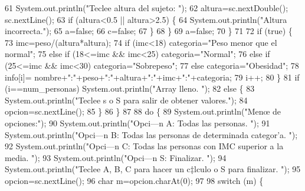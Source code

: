 \begin{DoxyCode}
61                     System.out.println(\textcolor{stringliteral}{"Teclee altura del sujeto: "});
62                     altura=sc.nextDouble(); sc.nextLine();
63                     \textcolor{keywordflow}{if} (altura<0.5 || altura>2.5) \{
64                         System.out.println(\textcolor{stringliteral}{"Altura incorrecta."});
65                         a=\textcolor{keyword}{false};
66                         c=\textcolor{keyword}{false};
67                     \} 
68                 \}
69                 a=\textcolor{keyword}{false};
70             \}
71                 
72             \textcolor{keywordflow}{if} (\textcolor{keyword}{true}) \{
73                 imc=peso/(altura*altura);
74                 \textcolor{keywordflow}{if} (imc<18) categoria=\textcolor{stringliteral}{"Peso menor que el normal"};
75                 \textcolor{keywordflow}{else} \textcolor{keywordflow}{if} (18<=imc && imc<25) categoria=\textcolor{stringliteral}{"Normal"};                 
76                 \textcolor{keywordflow}{else} \textcolor{keywordflow}{if} (25<=imc && imc<30) categoria=\textcolor{stringliteral}{"Sobrepeso"};
77                 \textcolor{keywordflow}{else} categoria=\textcolor{stringliteral}{"Obesidad"};
78                 info[i]= nombre+\textcolor{stringliteral}{":"}+peso+\textcolor{stringliteral}{":"}+altura+\textcolor{stringliteral}{":"}+imc+\textcolor{stringliteral}{":"}+categoria;
79                 i++;
80             \}
81             \textcolor{keywordflow}{if} (i==num\_personas) System.out.println(\textcolor{stringliteral}{"Array lleno. "});
82             \textcolor{keywordflow}{else} \{
83             System.out.println(\textcolor{stringliteral}{"Teclee s o S para salir de obtener valores."});
84             opcion=sc.nextLine();
85             \}
86         \}
87         
88         \textcolor{keywordflow}{do} \{
89         System.out.println(\textcolor{stringliteral}{"Menœ de opciones:"});
90         System.out.println(\textcolor{stringliteral}{"Opci—n A: Todas las personas. "});
91         System.out.println(\textcolor{stringliteral}{"Opci—n B: Todas las personas de determinada categor’a. "});
92         System.out.println(\textcolor{stringliteral}{"Opci—n C: Todas las personas con IMC superior a la media. "});
93         System.out.println(\textcolor{stringliteral}{"Opci—n S: Finalizar. "});
94         System.out.println(\textcolor{stringliteral}{"Teclee A, B, C para hacer un c‡lculo o S para finalizar. "});
95         opcion=sc.nextLine();
96         \textcolor{keywordtype}{char} m=opcion.charAt(0);
97         
98         \textcolor{keywordflow}{switch} (m) \{

\end{DoxyCode}
